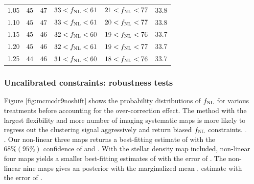 \begin{table}
{\begin{tabular}{llllll}
1.05                                    & $    45$& $    47$& $    33<f_{\rm NL}<    61$& $    21<f_{\rm NL}<    77$ &   33.8\\
1.10                                    & $    45$& $    47$& $    33<f_{\rm NL}<    61$& $    20<f_{\rm NL}<    77$ &   33.8\\
1.15                                    & $    45$& $    46$& $    32<f_{\rm NL}<    60$& $    19<f_{\rm NL}<    76$ &   33.7\\
1.20                                    & $    45$& $    46$& $    32<f_{\rm NL}<    61$& $    19<f_{\rm NL}<    77$ &   33.7\\
1.25                                    & $    44$& $    46$& $    31<f_{\rm NL}<    60$& $    18<f_{\rm NL}<    76$ &   33.7
    \end{tabular}}
\end{table}

\subsubsection{Uncalibrated constraints: robustness tests}
Figure \ref{fig:mcmcdr9noshift} shows the probability distributions of $f_{\rm NL}$ for various treatments before accounting for the over-correction effect. The method with the largest flexibility and more number of imaging systematic maps is more likely to regress out the clustering signal aggressively and return biased $f_{\rm NL}$ constraints. . . Our non-linear three maps returns a best-fitting estimate of  with the $68\%(95\%)$ confidence of  and . With the stellar density map included, non-linear four maps yields a smaller best-fitting estimates of  with the error of . The non-linear nine maps gives an  posterior with the marginalized mean ,  estimate  with the error of . 


